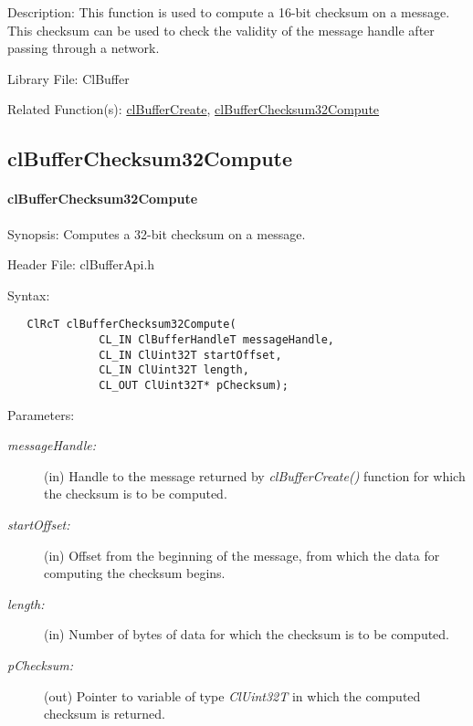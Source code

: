 \begin{Desc}
\item[Description:]This function is used to compute a 16-bit checksum on a message. This checksum can be used to check the validity of the message handle after passing through a network.\end{Desc}
\begin{Desc}
\item[Library File:]Cl\-Buffer\end{Desc}
\begin{Desc}
\item[Related Function(s):]\hyperlink{pagebuf103}{cl\-Buffer\-Create}, \hyperlink{pagebuf111}{cl\-Buffer\-Checksum32Compute} \end{Desc}


\newpage
\subsection{clBufferChecksum32Compute}
\hypertarget{pagebuf111}{}\paragraph{cl\-Buffer\-Checksum32Compute}\label{pagebuf111}
\begin{Desc}
\item[Synopsis:]Computes a 32-bit checksum on a message.\end{Desc}
\begin{Desc}
\item[Header File:]clBufferApi.h\end{Desc}
\begin{Desc}
\item[Syntax:]

\footnotesize\begin{verbatim}   ClRcT clBufferChecksum32Compute(
              CL_IN ClBufferHandleT messageHandle,
              CL_IN ClUint32T startOffset,
              CL_IN ClUint32T length,
              CL_OUT ClUint32T* pChecksum);
\end{verbatim}
\normalsize
\end{Desc}
\begin{Desc}
\item[Parameters:]
\begin{description}
\item[{\em message\-Handle:}](in) Handle to the message returned by \textit{clBufferCreate()} function for which the checksum is to be computed. 
\item[{\em start\-Offset:}](in) Offset from the beginning of the message, from which the data for computing the checksum begins. 
\item[{\em length:}](in) Number of bytes of data for which the checksum is to be computed. \item[{\em p\-Checksum:}](out) Pointer to variable of type {\em Cl\-Uint32T\/} in which the computed checksum is returned.\end{description}
\end{Desc}
